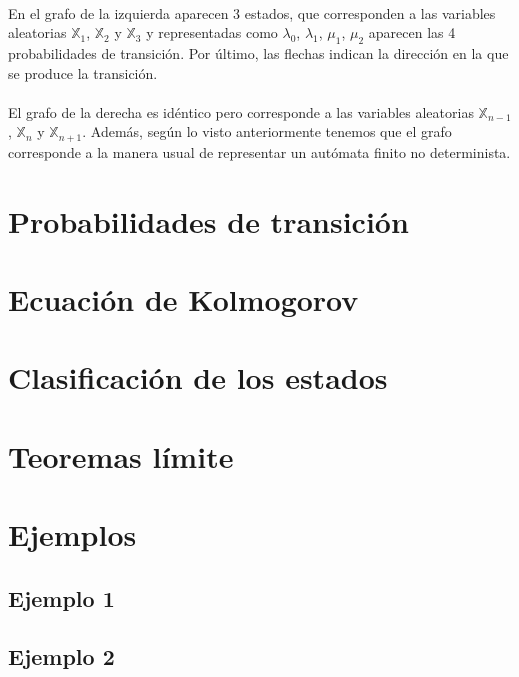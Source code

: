 \documentclass[12pt,a4paper]{article}
\begin{document}
\\
En el grafo de la izquierda aparecen 3 estados, que corresponden a las variables aleatorias $\mathbb{X}_1$, $\mathbb{X}_2$ y $\mathbb{X}_3$ y representadas como $\lambda_0$, $\lambda_1$, $\mu_1$, $\mu_2$ aparecen las 4 probabilidades de transición. Por último, las flechas indican la dirección en la que se produce la transición.
\\\\
El grafo de la derecha es idéntico pero corresponde a las variables aleatorias $\mathbb{X}_{n-1}$, $\mathbb{X}_n$ y $\mathbb{X}_{n+1}$. Además, según lo visto anteriormente tenemos que el grafo corresponde a la manera usual de representar un autómata finito no determinista.
\section{Probabilidades de transición}
\section{Ecuación de Kolmogorov}
\section{Clasificación de los estados}
\section{Teoremas límite}
\section{Ejemplos}
\subsection{Ejemplo 1}
\subsection{Ejemplo 2}
\end{document}
